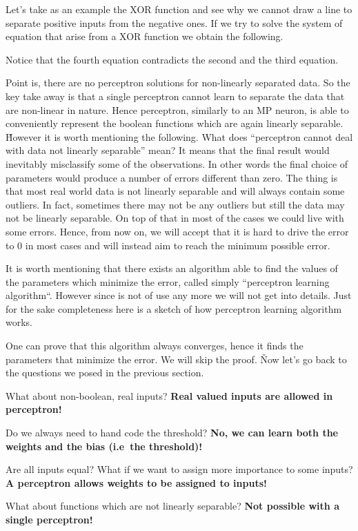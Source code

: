 \be
Let's take as an example the XOR function and see why we cannot draw a line to separate positive inputs from the
negative ones. If we try to solve the system of equation that arise from a XOR function we obtain the following.


\vspace{-5pt}

Notice that the fourth equation contradicts the second and the third equation.
\ee

Point is, there are no perceptron solutions for non-linearly separated data. So the key take away is that a single
perceptron cannot learn to separate the data that are non-linear in nature. Hence perceptron, similarly to an MP
neuron, is able to conveniently represent the boolean functions which are again linearly separable. \v

However it is worth mentioning the following. What does ``perceptron cannot deal with data not linearly separable''
mean? It means that the final result would inevitably misclassify some of the observations. In other words the final
choice of parameters would produce a number of errors different than zero. The thing is that most real world data is
not linearly separable and will always contain some outliers. In fact, sometimes there may not be any outliers but
still the data may not be linearly separable. On top of that in most of the cases we could live with some errors.
Hence, from now on, we will accept that it is hard to drive the error to 0 in most cases and will instead aim to
reach the minimum possible error.


It is worth mentioning that there exists an algorithm able to find the values of the parameters which minimize the
error, called simply ``perceptron learning algorithm``. However since is not of use any more we will not get into
details. Just for the sake completeness here is a sketch of how perceptron learning algorithm works.


One can prove that this algorithm always converges, hence it finds the parameters that minimize the error. We will
skip the proof. \v

Now let's go back to the questions we posed in the previous section.
\bit
\item What about non-boolean, real inputs? \textbf{Real valued inputs are allowed in perceptron!}
\item Do we always need to hand code the threshold? \textbf{No, we can learn both the weights and the bias (i.e\ the
threshold)!}
\item Are all inputs equal? What if we want to assign more importance to some inputs? \textbf{A perceptron allows
weights to be assigned to inputs!}
\item What about functions which are not linearly separable? \textbf{Not possible with a single perceptron!}
\eit

